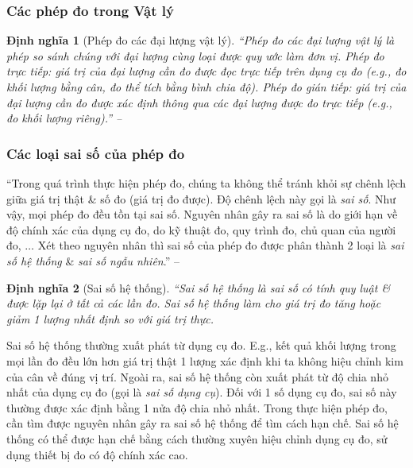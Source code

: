 \documentclass[oneside]{book}
\numberwithin{equation}{section}
\newtheorem{dinhnghia}{Định nghĩa}[section]
\begin{document}
\subsubsection{Các phép đo trong Vật lý}

\begin{dinhnghia}[Phép đo các đại lượng vật lý]
	``\emph{Phép đo các đại lượng vật lý} là phép so sánh chúng với đại lượng cùng loại được quy ước làm đơn vị. \emph{Phép đo trực tiếp}: giá trị của đại lượng cần đo được đọc trực tiếp trên dụng cụ đo (e.g., đo khối lượng bằng cân, đo thể tích bằng bình chia độ). \emph{Phép đo gián tiếp}: giá trị của đại lượng cần đo được xác định thông qua các đại lượng được đo trực tiếp (e.g., đo khối lượng riêng).'' -- \cite[p. 18]{SGK_Vat_Ly_10_Chan_Troi_Sang_Tao}
\end{dinhnghia}

\subsubsection{Các loại sai số của phép đo}
``Trong quá trình thực hiện phép đo, chúng ta không thể tránh khỏi sự chênh lệch giữa giá trị thật \& số đo (giá trị đo được). Độ chênh lệch này gọi là \textit{sai số}. Như vậy, mọi phép đo đều tồn tại sai số. Nguyên nhân gây ra sai số là do giới hạn về độ chính xác của dụng cụ đo, do kỹ thuật đo, quy trình đo, chủ quan của người đo, $\ldots$ Xét theo nguyên nhân thì sai số của phép đo được phân thành 2 loại là \textit{sai số hệ thống} \& \textit{sai số ngẫu nhiên}.'' -- \cite[p. 19]{SGK_Vat_Ly_10_Chan_Troi_Sang_Tao}

\begin{dinhnghia}[Sai số hệ thống]
	``\emph{Sai số hệ thống} là sai số có tính quy luật \& được lặp lại ở tất cả các lần đo. Sai số hệ thống làm cho giá trị đo tăng hoặc giảm 1 lượng nhất định so với giá trị thực.
\end{dinhnghia}
Sai số hệ thống thường xuất phát từ dụng cụ đo. E.g., kết quả khối lượng trong mọi lần đo đều lớn hơn giá trị thật 1 lượng xác định khi ta không hiệu chỉnh kim của cân về đúng vị trí. Ngoài ra, sai số hệ thống còn xuất phát từ độ chia nhỏ nhất của dụng cụ đo (gọi là \textit{sai số dụng cụ}). Đối với 1 số dụng cụ đo, sai số này thường được xác định bằng 1 nửa độ chia nhỏ nhất. Trong thực hiện phép đo, cần tìm được nguyên nhân gây ra sai số hệ thống để tìm cách hạn chế. Sai số hệ thống có thể được hạn chế bằng cách thường xuyên hiệu chỉnh dụng cụ đo, sử dụng thiết bị đo có độ chính xác cao.
\end{document}

